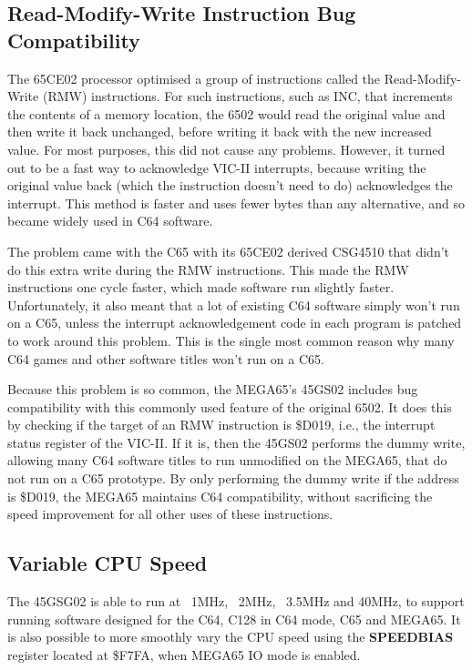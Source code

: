\subsection{Read-Modify-Write Instruction Bug Compatibility}

The 65CE02 processor optimised a group of instructions called the Read-Modify-Write (RMW)
instructions.  For such instructions, such as INC, that increments the contents of a memory
location, the 6502 would read the original value and then write it back unchanged, before
writing it back with the new increased value.  For most purposes, this did not cause any
problems. However, it turned out to be a fast way to acknowledge VIC-II interrupts, because
writing the original value back (which the instruction doesn't need to do) acknowledges
the interrupt.  This method is faster and uses fewer bytes than any alternative, and so
became widely used in C64 software.

The problem came with the C65 with its 65CE02 derived CSG4510 that didn't do this extra write
during the RMW instructions.  This made the RMW instructions one cycle faster, which made
software run slightly faster. Unfortunately, it also meant that a lot of existing C64 software
simply won't run on a C65, unless the interrupt acknowledgement code in each program is patched
to work around this problem. This is the single most common reason why many C64 games and other
software titles won't run on a C65.

Because this problem is so common, the MEGA65's 45GS02 includes bug compatibility with this
commonly used feature of the original 6502.  It does this by checking if the target of an RMW
instruction is \$D019, i.e., the interrupt status register of the VIC-II.  If it is, then
the 45GS02 performs the dummy write, allowing many C64 software titles to run unmodified on the
MEGA65, that do not run on a C65 prototype.  By only performing the dummy write if the address
is \$D019, the MEGA65 maintains C64 compatibility, without sacrificing the speed improvement
for all other uses of these instructions.

\subsection{Variable CPU Speed}

The 45GSG02 is able to run at ~1MHz, ~2MHz, ~3.5MHz and 40MHz, to support running software
designed for the C64, C128 in C64 mode, C65 and MEGA65.  It is also possible to more smoothly
vary the CPU speed using the {\bf SPEEDBIAS} register located at \$F7FA, when MEGA65 IO mode
is enabled.

